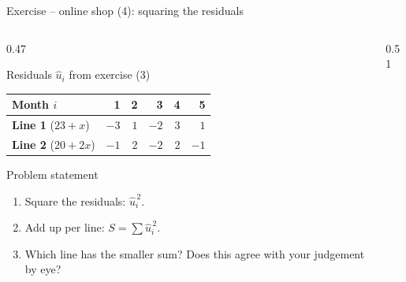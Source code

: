 \documentclass[aspectratio=169,11pt]{beamer}
\newcommand{\shoppoints}{\addplot[only marks, mark=*, mark size=2.6pt, color=hsbiblau]
  coordinates {(1,21) (2,26) (3,24) (4,30) (5,29)};}
\begin{document}
\begin{frame}{Exercise -- online shop (4): squaring the residuals}
  \begin{columns}[T]
    \begin{column}{0.47\textwidth}
      \small
      \begin{block}{Residuals $\hat{u}_i$ from exercise (3)}
        \centering
        \renewcommand{\arraystretch}{1.1}\setlength{\tabcolsep}{4pt}
        \begin{tabular}{l*{5}{r}}
          \toprule
          Month $i$                                                & 1    & 2   & 3    & 4   & 5    \\
          \midrule
          {\color{hsbiorange!85!black}\textbf{Line 1}} ($23 + x$)  & $-3$ & $1$ & $-2$ & $3$ & $1$  \\
          {\color{hsbiviolett}\textbf{Line 2}} ($20 + 2x$)         & $-1$ & $2$ & $-2$ & $2$ & $-1$ \\
          \bottomrule
        \end{tabular}
      \end{block}
      \begin{block}{Problem statement}
        \begin{enumerate}
          \item Square the residuals: $\hat{u}_i^{\,2}$.
          \item Add up per line: $S = \sum \hat{u}_i^{\,2}$.
          \item Which line has the smaller sum? Does this agree with your
                judgement by eye?
        \end{enumerate}
      \end{block}
    \end{column}
    \begin{column}{0.51\textwidth}
    \end{column}
  \end{columns}
\end{frame}
\end{document}

